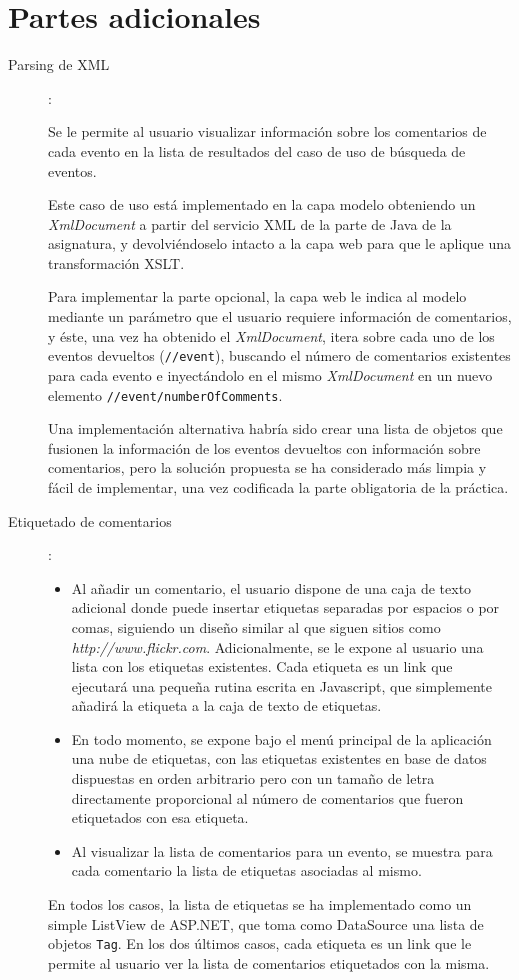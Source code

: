\documentclass[a4paper,twoside]{article}
\begin{document}
\newpage
\section{Partes adicionales}

\begin{description}
\item[Parsing de XML]:

Se le permite al usuario visualizar información sobre los comentarios de cada evento en la lista de resultados del caso de uso de búsqueda de eventos.

Este caso de uso está implementado en la capa modelo obteniendo un {\it XmlDocument} a partir del servicio XML de la parte de Java de la asignatura, y devolviéndoselo intacto a la capa web para que le aplique una transformación XSLT.

Para implementar la parte opcional, la capa web le indica al modelo mediante un parámetro que el usuario requiere información de comentarios, y éste, una vez ha obtenido el {\it XmlDocument}, itera sobre cada uno de los eventos devueltos ({\tt //event}), buscando el número de comentarios existentes para cada evento e inyectándolo en el mismo {\it XmlDocument} en un nuevo elemento {\tt //event/numberOfComments}.

Una implementación alternativa habría sido crear una lista de objetos que fusionen la información de los eventos devueltos con información sobre comentarios, pero la solución propuesta se ha considerado más limpia y fácil de implementar, una vez codificada la parte obligatoria de la práctica.

\item[Etiquetado de comentarios]:

\begin{itemize}
\item Al añadir un comentario, el usuario dispone de una caja de texto adicional donde puede insertar etiquetas separadas por espacios o por comas, siguiendo un diseño similar al que siguen sitios como {\it http://www.flickr.com}. Adicionalmente, se le expone al usuario una lista con los etiquetas existentes. Cada etiqueta es un link que ejecutará una pequeña rutina escrita en Javascript, que simplemente añadirá la etiqueta a la caja de texto de etiquetas.
\item En todo momento, se expone bajo el menú principal de la aplicación una nube de etiquetas, con las etiquetas existentes en base de datos dispuestas en orden arbitrario pero con un tamaño de letra directamente proporcional al número de comentarios que fueron etiquetados con esa etiqueta.
\item Al visualizar la lista de comentarios para un evento, se muestra para cada comentario la lista de etiquetas asociadas al mismo.
\end{itemize}

En todos los casos, la lista de etiquetas se ha implementado como un simple ListView de ASP.NET, que toma como DataSource una lista de objetos {\tt Tag}. En los dos últimos casos, cada etiqueta es un link que le permite al usuario ver la lista de comentarios etiquetados con la misma.

\end{description}
\end{document}
